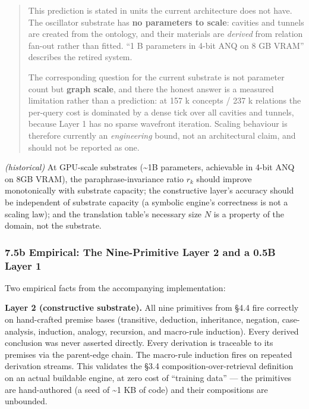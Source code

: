 \documentclass[
  11pt,
  a4paper,
]{article}
\begin{document}
\begin{quote}
This prediction is stated in units the current architecture does not
have. The oscillator substrate has \textbf{no parameters to scale}:
cavities and tunnels are created from the ontology, and their materials
are \emph{derived} from relation fan-out rather than fitted. ``1 B
parameters in 4-bit ANQ on 8 GB VRAM'' describes the retired system.

The corresponding question for the current substrate is not parameter
count but \textbf{graph scale}, and there the honest answer is a
measured limitation rather than a prediction: at 157 k concepts / 237 k
relations the per-query cost is dominated by a dense tick over all
cavities and tunnels, because Layer 1 has no sparse wavefront iteration.
Scaling behaviour is therefore currently an \emph{engineering} bound,
not an architectural claim, and should not be reported as one.
\end{quote}

\emph{(historical)} At GPU-scale substrates (\textasciitilde1B
parameters, achievable in 4-bit ANQ on 8GB VRAM), the
paraphrase-invariance ratio \(r_k\) should improve monotonically with
substrate capacity; the constructive layer's accuracy should be
independent of substrate capacity (a symbolic engine's correctness is
not a scaling law); and the translation table's necessary size \(N\) is
a property of the domain, not the substrate.

\subsubsection{7.5b Empirical: The Nine-Primitive Layer 2 and a 0.5B
Layer
1}\label{b-empirical-the-nine-primitive-layer-2-and-a-0.5b-layer-1}

Two empirical facts from the accompanying implementation:

\textbf{Layer 2 (constructive substrate).} All nine primitives from §4.4
fire correctly on hand-crafted premise bases (transitive, deduction,
inheritance, negation, case-analysis, induction, analogy, recursion, and
macro-rule induction). Every derived conclusion was never asserted
directly. Every derivation is traceable to its premises via the
parent-edge chain. The macro-rule induction fires on repeated derivation
streams. This validates the §3.4 composition-over-retrieval definition
on an actual buildable engine, at zero cost of ``training data'' --- the
primitives are hand-authored (a seed of \textasciitilde1 KB of code) and
their compositions are unbounded.
\end{document}
